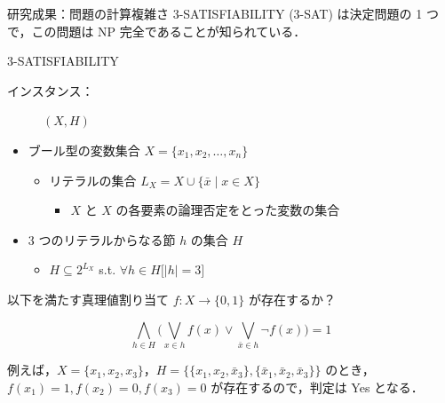 \documentclass[dvipdfmx]{beamer}
\begin{document}
    \begin{frame}{研究成果：問題の計算複雑さ}
      \textsc{3-SATISFIABILITY (3-SAT) } は決定問題の 1 つで，この問題は NP 完全であることが知られている．
      \begin{block}{\textsc{3-SATISFIABILITY}}
        \begin{description}
          \item[インスタンス：] $(X,H)$
          \vspace{-2mm}
        \end{description}
        \begin{itemize}
          \item ブール型の変数集合 $X=\{x_1,x_2,\dots ,x_n\}$
          \begin{itemize}
            \item リテラルの集合 $L_X = X \cup \{\bar x \mid x \in X\}$
            \begin{itemize}
              \item $X$ と $X$ の各要素の論理否定をとった変数の集合
            \end{itemize}
          \end{itemize}
          \item 3 つのリテラルからなる節 $h$ の集合 $H$
          \begin{itemize}
            \item $H \subseteq 2^{L_X}$ s.t. $\forall h \in H \big[|h| = 3\big]$
          \end{itemize}
        \end{itemize}
        \begin{description}
          \setlength{\leftskip}{-8mm}
          \item[問題：] 以下を満たす真理値割り当て $f : X \to \{0,1\}$ が存在するか？
        \end{description}
        \vspace{-1mm}
        $$\displaystyle \bigwedge_{h \in H} \bigg(\bigvee_{x \in h}f(x) \lor \bigvee_{\bar x \in h}\lnot f(x) \bigg) = 1$$
        \vspace{-1mm}
      \end{block}

      例えば，$X = \{x_1,x_2,x_3\}$，$H = \big\{ \{x_1, x_2, \bar x_3\}, \{\bar x_1, \bar x_2,\bar x_3\}\big\}$ のとき，
      $f(x_1) = 1, f(x_2) = 0, f(x_3) = 0$ が存在するので，判定は Yes となる．
    \end{frame}
\end{document}
